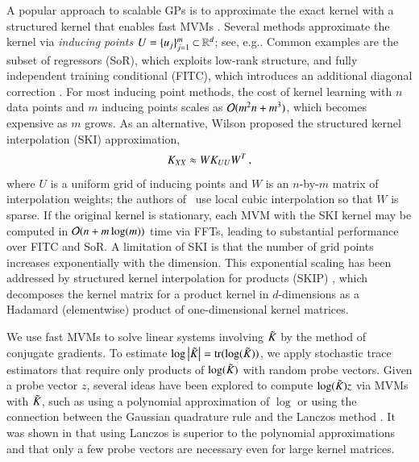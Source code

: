 A popular approach to scalable GPs is to approximate the exact kernel with a
structured kernel that enables fast MVMs \citep{quinonero2005unifying}. Several
methods approximate the kernel via {\em inducing points} $U = \{u_j\}_{j=1}^m
\mathbin{\subset} \mathbb{R}^d$; see, e.g.\citep{quinonero2005unifying,le2013fastfood,
hensman2013uai}. Common examples are the subset of regressors (SoR), which
exploits low-rank structure, and fully independent training conditional (FITC),
which introduces an additional diagonal correction \citep{snelson2006sparse}.
For most inducing point methods, the cost of kernel learning with $n$ data
points and $m$ inducing points scales as $\mathcal{O}(m^2 n + m^3)$, which becomes
expensive as $m$ grows. As an alternative, Wilson proposed the structured kernel
interpolation (SKI) approximation,
\begin{equation}\label{eqn: ski}
  K_{XX} \approx W K_{UU} W^{T}\,,
\end{equation}
where $U$ is a uniform grid of inducing points and $W$ is an $n$-by-$m$ matrix
of interpolation weights; the authors of~\citep{wilson2015kernel} use local
cubic interpolation so that $W$ is sparse. If the original kernel is stationary,
each MVM with the SKI kernel may be computed in $\mathcal{O}(n + m\log(m))$ time via
FFTs, leading to substantial performance over FITC and SoR. A limitation of SKI
is that the number of grid points increases exponentially with the dimension.
This exponential scaling has been addressed by structured kernel interpolation
for products (SKIP) \citep{gardner2018product}, which decomposes the kernel
matrix for a product kernel in $d$-dimensions as a Hadamard (elementwise)
product of one-dimensional kernel matrices.

We use fast MVMs to solve linear systems involving $\tilde{K}_{}$ by the method of
conjugate gradients.  To estimate $\log \left\lvert\tilde{K}_{}\right\rvert = \operatorname{tr}(\log(\tilde{K}_{}))$, we
apply stochastic trace estimators that require only products of $\log(\tilde{K}_{})$
with random probe vectors. Given a probe vector $z$, several ideas have been
explored to compute $\log(\tilde{K}_{}) z$ via MVMs with $\tilde{K}_{}$, such as using a
polynomial approximation of $\log$ or using the connection between the Gaussian
quadrature rule and the Lanczos method \citep{han2015large,ubarufast}. It was
shown in \citep{dong2017scalable} that using Lanczos is superior to the
polynomial approximations and that only a few probe vectors are necessary even
for large kernel matrices.

